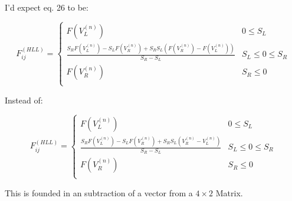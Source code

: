 \documentclass[a4paper]{scrarticle}
\begin{document}
I'd expect eq. 26 to be:

\begin{equation}
F^{(HLL)}_{ij}=
\begin{cases}
  F\left(V_L^{(n)}\right) & 0 \leq S_L\\
  \frac{S_R F\left(V_L^{(n)}\right) - S_L F\left(V_R^{(n)}\right) + S_R S_L (F\left(V_R^{(n)}\right) - F\left(V_L^{(n)}\right))}{S_R - S_L} & S_L \leq 0 \leq S_R\\
  F\left(V_R^{(n)}\right) & S_R \leq 0\\
\end{cases}
\tag{26}
\end{equation}

Instead of:

\begin{equation}
F^{(HLL)}_{ij}=
\begin{cases}
  F\left(V_L^{(n)}\right) & 0 \leq S_L\\
  \frac{S_R F\left(V_L^{(n)}\right) - S_L F\left(V_R^{(n)}\right) + S_R S_L (V_R^{(n)} - V_L^{(n)})
  }{S_R - S_L} & S_L \leq 0 \leq S_R\\
  F\left(V_R^{(n)}\right) & S_R \leq 0\\
\end{cases}
\tag{26 original}
\end{equation}

This is founded in an subtraction of a vector from a $4 \times 2$ Matrix.
\end{document}
